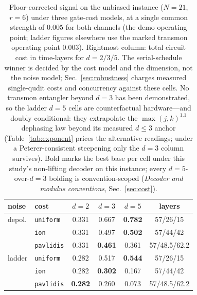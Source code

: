 \documentclass[aps,pra,reprint,superscriptaddress,nofootinbib,floatfix]{revtex4-2}
\begin{document}
\begin{table}[t]
\caption{Floor-corrected signal on the unbiased instance ($N=21$,
$r=6$) under three gate-cost models, at a single common strength of
$0.005$ for both channels (the demo operating point; ladder figures
elsewhere use the marked transmon operating point $0.003$). Rightmost
column: total circuit cost in time-layers for $d=2/3/5$. The
serial-schedule winner is
decided by the cost model and the dimension, not the noise model;
Sec.~\ref{sec:robustness} charges measured single-qudit costs and
concurrency against these cells. No transmon entangler beyond $d=3$
has been demonstrated, so the ladder $d=5$ cells are counterfactual
hardware---and doubly conditional: they extrapolate the
$\max(j,k)^{1.1}$ dephasing law beyond its measured $d\le3$ anchor
(Table~\ref{tab:exponent} prices the alternative readings; under a
Peterer-consistent steepening only the $d=3$ column survives). Bold
marks the best base per cell under this study's non-lifting decoder
on this instance; every $d{=}5$-over-$d{=}3$ bolding is
convention-scoped (\emph{Decoder and modulus conventions},
Sec.~\ref{sec:cost}).}
\label{tab:cost}
\begin{ruledtabular}
\begin{tabular}{llcccc}
noise & cost & $d{=}2$ & $d{=}3$ & $d{=}5$ & layers \\
\hline
depol. & \texttt{uniform}  & 0.331 & 0.667 & \textbf{0.782} & 57/26/15 \\
       & \texttt{ion}      & 0.331 & 0.497 & \textbf{0.502} & 57/44/42 \\
       & \texttt{pavlidis} & 0.331 & \textbf{0.461} & 0.361 & 57/48.5/62.2 \\
ladder & \texttt{uniform}  & 0.282 & 0.517 & \textbf{0.544} & 57/26/15 \\
       & \texttt{ion}      & 0.282 & \textbf{0.302} & 0.167 & 57/44/42 \\
       & \texttt{pavlidis} & \textbf{0.282} & 0.260 & 0.073 & 57/48.5/62.2 \\
\end{tabular}
\end{ruledtabular}
\end{table}
\end{document}
